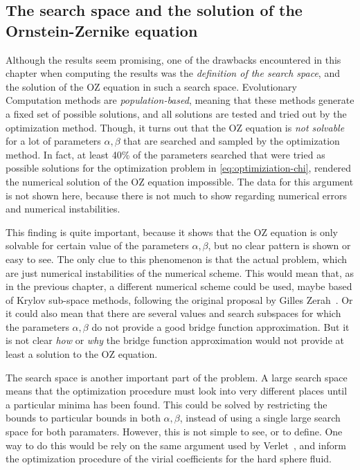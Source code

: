 \subsection{The search space and the solution of the Ornstein-Zernike equation}
Although the results seem promising, one of the drawbacks encountered in this chapter when 
computing the results was the \emph{definition of the search space}, and the solution of 
the OZ equation in such a search space. Evolutionary Computation 
methods are \emph{population-based}, meaning that these methods generate a fixed set of 
possible solutions, and all solutions are tested and tried out by the optimization method. 
Though, it turns out that the OZ equation is \emph{not solvable} for a lot of parameters 
\(\alpha, \beta\) that are searched and sampled by the optimization method. In fact, at 
least 40\% of the parameters searched that were tried as possible solutions for the 
optimization problem in \autoref{eq:optimiziation-chi}, rendered the numerical solution of 
the OZ equation impossible. The data for this argument is not shown here, because there is 
not much to show regarding numerical errors and numerical instabilities.

This finding is quite important, because it shows that the OZ equation is only solvable for 
certain value of the parameters \(\alpha, \beta\), but no clear pattern is shown or easy to 
see. The only clue to this phenomenon is that the actual problem, which are just numerical 
instabilities of the numerical scheme. This would mean that, as in the previous chapter, a 
different numerical scheme could be used, maybe based of Krylov sub-space methods, 
following the original proposal by Gilles Zerah~\cite{zerahEfficientNewtonMethod1985}. Or 
it could also mean that there are several values and search subspaces for which the 
parameters \(\alpha, \beta\) do not provide a good bridge function approximation. But it is 
not clear \emph{how} or \emph{why} the bridge function approximation would not provide at 
least a solution to the OZ equation.

The search space is another important part of the problem. A large search space means that 
the optimization procedure must look into very different places until a particular minima 
has been found. This could be solved by restricting the bounds to particular bounds in both 
\(\alpha, \beta\), instead of using a single large search space for both paramaters. 
However, this is not simple to see, or to define. One way to do this would be rely on the 
same argument used by Verlet~\cite{verletIntegralEquationsClassical1980}, and inform the 
optimization procedure of the virial coefficients for the hard sphere fluid.

